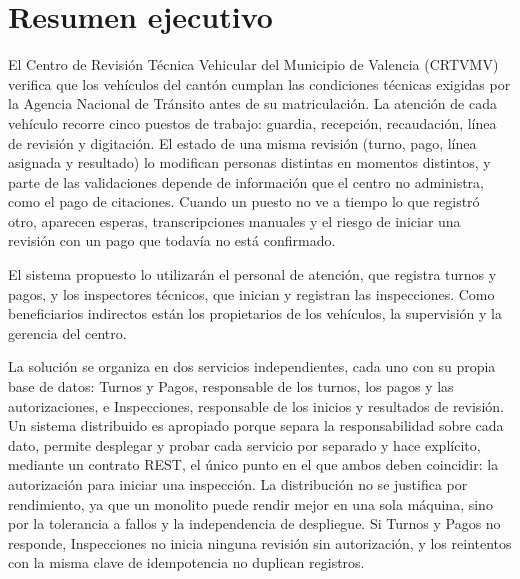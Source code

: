 \documentclass[11pt,a4paper]{article}
\begin{document}
	\tableofcontents
	\newpage
	
	\section*{Resumen ejecutivo}
	El Centro de Revisión Técnica Vehicular del Municipio de Valencia (CRTVMV) verifica que los vehículos del cantón cumplan las condiciones técnicas exigidas por la Agencia Nacional de Tránsito antes de su matriculación. La atención de cada vehículo recorre cinco puestos de trabajo: guardia, recepción, recaudación, línea de revisión y digitación. El estado de una misma revisión (turno, pago, línea asignada y resultado) lo modifican personas distintas en momentos distintos, y parte de las validaciones depende de información que el centro no administra, como el pago de citaciones. Cuando un puesto no ve a tiempo lo que registró otro, aparecen esperas, transcripciones manuales y el riesgo de iniciar una revisión con un pago que todavía no está confirmado.
	
	El sistema propuesto lo utilizarán el personal de atención, que registra turnos y pagos, y los inspectores técnicos, que inician y registran las inspecciones. Como beneficiarios indirectos están los propietarios de los vehículos, la supervisión y la gerencia del centro.
	
	La solución se organiza en dos servicios independientes, cada uno con su propia base de datos: Turnos y Pagos, responsable de los turnos, los pagos y las autorizaciones, e Inspecciones, responsable de los inicios y resultados de revisión. Un sistema distribuido es apropiado porque separa la responsabilidad sobre cada dato, permite desplegar y probar cada servicio por separado y hace explícito, mediante un contrato REST, el único punto en el que ambos deben coincidir: la autorización para iniciar una inspección. La distribución no se justifica por rendimiento, ya que un monolito puede rendir mejor en una sola máquina, sino por la tolerancia a fallos y la independencia de despliegue. Si Turnos y Pagos no responde, Inspecciones no inicia ninguna revisión sin autorización, y los reintentos con la misma clave de idempotencia no duplican registros.
	
\end{document}
